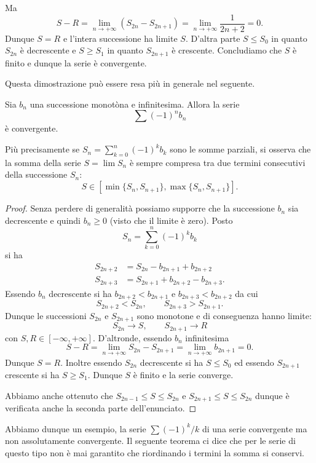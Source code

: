 Ma
\[
  S - R = \lim_{n\to +\infty} (S_{2n} - S_{2n+1}) = \lim_{n\to+\infty}\frac{1}{2n+2} = 0.
\]
Dunque $S=R$ e l'intera successione ha limite $S$. 
D'altra parte $S \le S_0$ in quanto $S_{2n}$ è decrescente e $S\ge S_1$ in quanto $S_{2n+1}$ è crescente. 
Concludiamo che $S$ è finito e dunque la serie è convergente.

Questa dimostrazione può essere resa più in generale nel seguente.

\begin{theorem}
\label{th:Leibniz}%
\mymark{***}%
%
%
%
%
Sia $b_n$ una successione monotòna e infinitesima. Allora
la serie
\[
  \sum (-1)^{n} b_n
\]
è convergente.

Più precisamente se $\displaystyle S_n = \sum_{k=0}^n (-1)^k b_k$
sono le somme parziali,
si osserva che la somma della serie $S= \lim S_n$ è sempre compresa
tra due termini consecutivi della successione $S_n$:
\[
  S \in [\min\{S_n, S_{n+1}\}, \max\{S_n, S_{n+1}\}].
\]
\end{theorem}
%
\begin{proof}
\mymark{***}
Senza perdere di generalità possiamo supporre che la successione $b_n$ sia decrescente e quindi $b_n \ge 0$ (visto che il limite è zero).
Posto
\[
 S_n = \sum_{k=0}^n (-1)^k b_k
\]
si ha
\begin{align*}
  S_{2n+2} &= S_{2n} - b_{2n+1} + b_{2n+2} \\
  S_{2n+3} &= S_{2n+1} + b_{2n+2} - b_{2n+3}.
\end{align*}
Essendo $b_n$ decrescente si ha $b_{2n+2} < b_{2n+1}$ e $b_{2n+3} < b_{2n+2}$ da cui
\[
  S_{2n+2} < S_{2n}, \qquad S_{2n+3} > S_{2n+1}.
\]
Dunque le successioni $S_{2n}$ e $S_{2n+1}$ sono monotone e di conseguenza
hanno limite:
\[
  S_{2n} \to S, \qquad S_{2n+1} \to R
\]
con $S, R  \in [-\infty, +\infty]$.
D'altronde, essendo $b_n$ infinitesima
\[
  S - R
  = \lim_{n\to +\infty} S_{2n} - S_{2n+1}
  = \lim_{n\to +\infty} b_{2n+1} = 0.
\]
Dunque $S=R$. Inoltre essendo $S_{2n}$ decrescente si ha
$S \le S_0$ ed essendo $S_{2n+1}$ crescente si ha $S\ge S_1$.
Dunque $S$ è finito e la serie converge.

Abbiamo anche ottenuto che
$S_{2n-1} \le S \le S_{2n}$ e $S_{2n+1} \le S \le S_{2n}$
dunque è verificata anche la seconda parte dell'enunciato.
\end{proof}

Abbiamo dunque un esempio, la serie $\sum (-1)^k / k$ di una serie convergente ma non assolutamente convergente.
Il seguente teorema ci dice che per le serie di questo tipo non è mai garantito che riordinando i termini la somma si conservi.


